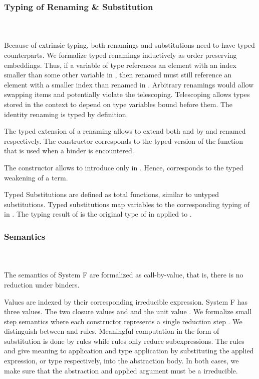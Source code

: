\subsubsection{Typing of Renaming \& Substitution}\hfill\\\\
Because of extrinsic typing, both renamings and substitutions need to have typed counterparts.
We formalize typed renamings  inductively as order preserving embeddings. 
Thus, if a variable  of type    references an element with an index smaller than some other variable  in , then renamed  must still reference an element with a smaller index than renamed  in .
Arbitrary renamings would allow swapping items and potentially violate the telescoping. 
Telescoping allows types stored in the context to depend on type variables bound before them.
\FRenTyping
The identity renaming  is typed by definition. 

\noindent The typed extension of a renaming  allows to extend both  and  by  and renamed  respectively. The constructor  corresponds to the typed version of the function  that is used when a binder is encountered. 

\noindent The constructor  allows to introduce  only in . 
Hence,  corresponds to the typed weakening of a term.

\noindent Typed Substitutions are defined as total functions, similar to untyped substitutions.
\FSubTyping
Typed substitutions  map variables    to the corresponding typing of  in . The typing result of  is the original type of  in  applied to .
\subsubsection{Semantics}\hfill\\\\
The semantics of System F are formalized as call-by-value, that is, there is no reduction under binders. 

\noindent Values are indexed by their corresponding irreducible expression.
\FVal
System F has three values. The two closure values  and  and the unit value .
We formalize small step semantics where each constructor represents a single reduction step   .
We distinguish between  and  rules. 
Meaningful computation in the form of substitution is done by  rules while  rules only reduce subexpressions.
\FSemantics
The rules  and  give meaning to application and type application by substituting the applied expression, or type respectively, into the abstraction body. In both cases, we make sure that the abstraction and applied argument must be a irreducible.

